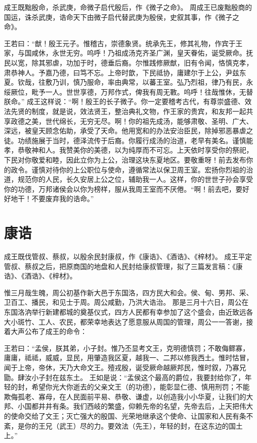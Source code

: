 \documentclass[a4paper,12pt,UTF8,twoside]{ctexbook}
\begin{document}
成王既黜殷命，杀武庚，命微子启代殷后，作《微子之命》。
周成王已废黜殷商的国运，诛杀武庚，诰命天下由微子启代替武庚为殷侯，史叙其事，作《微子之命》。

王若曰：“猷！殷王元子。惟稽古，崇德象贤。统承先王，修其礼物，作宾于王家，与国咸休，永世无穷。呜呼！乃祖成汤克齐圣广渊，皇天眷佑，诞受厥命。抚民以宽，除其邪虐，功加于时，德垂后裔。尔惟践修厥猷，旧有令闻，恪慎克孝，肃恭神人。予嘉乃德，曰笃不忘。上帝时歆，下民祗协，庸建尔于上公，尹兹东夏。钦哉，往敷乃训，慎乃服命，率由典常，以蕃王室。弘乃烈祖，律乃有民，永绥厥位，毗予一人。世世享德，万邦作式，俾我有周无斁。呜呼！往哉惟休，无替朕命。”
成王这样说：“啊！殷王的长子微子。你一定要稽考古代，有尊崇盛德、效法先贤的制度，就是说，效法贤王，整治典礼文物，作王家的贵宾，和友邦一起共享政德之美，世代绵长，无穷无尽。啊！你的祖先成汤，能够肃敬、圣明、广大、深远，被皇天顾念佑助，承受了天命。他用宽和的办法安治臣民，除掉邪恶暴虐之徒。功绩施展于当时，德泽流传于后裔。你履行成汤的治道，老早有美名。谨慎能孝，恭敬神和人。我赞美你的美德，以为纯厚而不可忘。上天依时享受你的祭祀，下民对你敬爱和睦，因此立你为上公，治理这块东夏地区。要敬重呀！前去发布你的政令。谨慎对待你的上公职位与使命，遵循常法以保卫周王室。宏扬你烈祖的治道，规范你的人民，长久安居上公之位，辅助我一人。这样，你的世世子孙会享受你的功德，万邦诸侯会以你为榜样，服从我周王室而不厌倦。“啊！前去吧，要好好地干！不要废弃我的诰命。”

\chapter{康诰}

成王既伐管叔、蔡叔，以殷余民封康叔，作《康诰》、《酒诰》、《梓材》。
成王平定管叔、蔡叔之后，把原商国的地盘和人民封给康叔管理，拟了三篇发言稿：《康诰》、《酒诰》、《梓材》。

惟三月哉生魄，周公初基作新大邑于东国洛，四方民大和会。侯、甸、男邦、采、卫百工、播民，和见士于周。周公咸勤，乃洪大诰治。
那是三月十六日，周公在东国洛汭举行新建都城的奠基仪式，四方人民都有幸参加了这个盛会，由近致远各大小斑竹、工人、农民，都荣幸地表达了愿意服从周国的管理，周公一一答谢，接着大声公布了成王的命令：

王若曰：“孟侯，朕其弟，小子封。惟乃丕显考文王，克明德慎罚；不敢侮鳏寡，庸庸，祗祗，威威，显民，用肇造我区夏，越我一、二邦以修我西土。惟时怙冒，闻于上帝，帝休，天乃大命文王。殪戎殷，诞受厥命越厥邦民，惟时叙，乃寡兄勖。肆汝小子封在兹东土。
王如是说：“孟侯这个最高的爵位，我要封给你了，年轻的封，希望你光大你逝去的父亲文王（的功德），能彰显仁德、慎用刑罚；不能欺侮孤老、寡母，在人民面前平易、恭敬、谦虚，以创造我小小华夏，让我们的大邦、小国都井井有条。我们西岐的繁盛，仰赖先帝的名望，先帝去后，上天把伟大的使命交给了文王；灭亡强大的殷国、光荣地继承这个使命、让国家和人民有条不紊，是你的王兄（武王）尽的力。要效法（先王），年轻的封，在这东边的国土上。”
\end{document}
